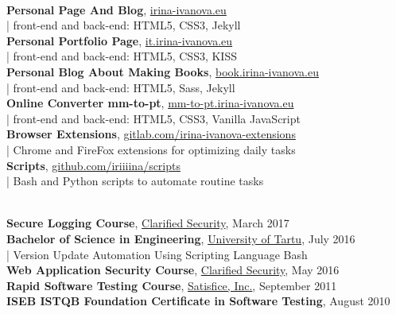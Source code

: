 \documentclass[a4paper, 12pt]{article}
\begin{document}
\\
\textbf{Personal Page And Blog}, \href{https://irina-ivanova.eu}{irina-ivanova.eu}\\
\indent | front-end and back-end: HTML5, CSS3, Jekyll\\
\textbf{Personal Portfolio Page}, \href{https://it.irina-ivanova.eu}{it.irina-ivanova.eu}\\
\indent | front-end and back-end: HTML5, CSS3, KISS\\
\textbf{Personal Blog About Making Books}, \href{https://book.irina-ivanova.eu}{book.irina-ivanova.eu}\\
\indent | front-end and back-end: HTML5, Sass, Jekyll\\
\textbf{Online Converter mm-to-pt}, \href{https://mm-to-pt.irina-ivanova.eu}{mm-to-pt.irina-ivanova.eu}\\
\indent | front-end and back-end: HTML5, CSS3, Vanilla JavaScript\\
\textbf{Browser Extensions}, \href{https://gitlab.com/irina-ivanova-extensions}{gitlab.com/irina-ivanova-extensions}\\
\indent | Chrome and FireFox extensions for optimizing daily tasks\\
\textbf{Scripts}, \href{https://github.com/iriiiina/scripts}{github.com/iriiiina/scripts}\\
\indent | Bash and Python scripts to automate routine tasks\\

\pagestyle{empty}

\newpage

\\
\textbf{Secure Logging Course}, \href{https://clarifiedsecurity.com/secure-logging-training/}{Clarified Security}, March 2017\\
\textbf{Bachelor of Science in Engineering}, \href{https://www.ut.ee/en}{University of Tartu}, July 2016\\
\indent | Version Update Automation Using Scripting Language Bash\\
\textbf{Web Application Security Course}, \href{https://www.clarifiedsecurity.com/web-application-security-training/}{Clarified Security}, May 2016\\
\textbf{Rapid Software Testing Course}, \href{http://www.satisfice.com/info_rst.shtml}{Satisfice, Inc.}, September 2011\\
\textbf{ISEB ISTQB Foundation Certificate in Software Testing}, August 2010

\pagestyle{empty}
\end{document}
